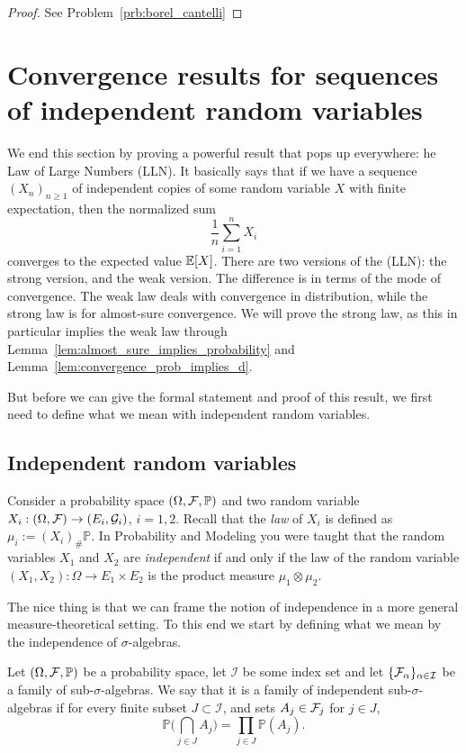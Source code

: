 \begin{proof}
See Problem~\ref{prb:borel_cantelli}
\end{proof}


\section{Convergence results for sequences of independent random variables}

We end this section by proving a powerful result that pops up everywhere: he Law of Large Numbers (LLN). It basically says that if we have a sequence $(X_n)_{n \ge 1}$ of independent copies of some random variable $X$ with finite expectation, then the normalized sum
\[
	\frac{1}{n} \sum_{i = 1}^n X_i
\]
converges to the expected value $\mathbb E[X]$. There are two versions of the (LLN): the strong version, and the weak version. The difference is in terms of the mode of convergence. The weak law deals with convergence in distribution, while the strong law is for almost-sure convergence. We will prove the strong law, as this in particular implies the weak law through Lemma~\ref{lem:almost_sure_implies_probability} and Lemma~\ref{lem:convergence_prob_implies_d}.

But before we can give the formal statement and proof of this result, we first need to define what we mean with independent random variables.

\subsection{Independent random variables}

Consider a probability space $(\Omega, \mathcal F, \mathbb{P})$ and two random variable $X_i: (\Omega, \mathcal F) \to (E_i, \mathcal{G}_i)$, $i=1,2$. Recall that the \emph{law} of $X_i$ is defined as $\mu_i:= (X_i)_\# \mathbb{P}$. In Probability and Modeling you were taught that the random variables $X_1$ and $X_2$ are \emph{independent} if and only if the law of the random variable $(X_1, X_2): \Omega \to E_1\times E_2$ is the product measure $\mu_1 \otimes \mu_2$.

The nice thing is that we can frame the notion of independence in a more general measure-theoretical setting. To this end we start by defining what we mean by the independence of $\sigma$-algebras.

\begin{definition}
	Let $(\Omega, \mathcal F, \mathbb{P})$ be a probability space, let $\mathcal{I}$ be some index set and let $\{\mathcal F_\alpha\}_{\alpha \in \mathcal{I}}$ be a family of sub-$\sigma$-algebras. We say that it is a family of independent sub-$\sigma$-algebras if for every finite subset $J \subset \mathcal{I}$, and sets $A_j\in \mathcal F_j$ for $j \in J$,
	\[
	\mathbb{P}\biggl( \bigcap_{j \in J} A_j \biggr) = \prod_{j \in J} \mathbb{P}(A_{j}).
	\]
\end{definition}

